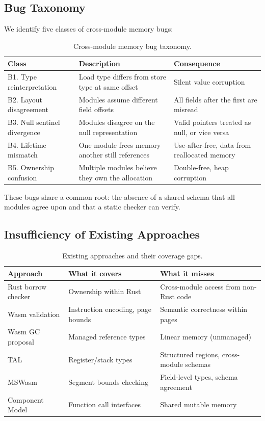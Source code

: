 \documentclass[11pt,a4paper]{article}
\begin{document}
\subsection{Bug Taxonomy}
\label{sec:bugs}

We identify five classes of cross-module memory bugs:

\begin{table}[htbp]
\centering
\caption{Cross-module memory bug taxonomy.}
\label{tab:bugs}
\begin{tabularx}{\textwidth}{@{}lXX@{}}
\toprule
\textbf{Class} & \textbf{Description} & \textbf{Consequence} \\
\midrule
B1. Type reinterpretation & Load type differs from store type at same offset & Silent value corruption \\
B2. Layout disagreement & Modules assume different field offsets & All fields after the first are misread \\
B3. Null sentinel divergence & Modules disagree on the null representation & Valid pointers treated as null, or vice versa \\
B4. Lifetime mismatch & One module frees memory another still references & Use-after-free, data from reallocated memory \\
B5. Ownership confusion & Multiple modules believe they own the allocation & Double-free, heap corruption \\
\bottomrule
\end{tabularx}
\end{table}

These bugs share a common root: the absence of a shared schema that all
modules agree upon and that a static checker can verify.

\subsection{Insufficiency of Existing Approaches}
\label{sec:existing}

\begin{table}[htbp]
\centering
\caption{Existing approaches and their coverage gaps.}
\label{tab:existing}
\begin{tabularx}{\textwidth}{@{}lXX@{}}
\toprule
\textbf{Approach} & \textbf{What it covers} & \textbf{What it misses} \\
\midrule
Rust borrow checker & Ownership within Rust & Cross-module access from non-Rust code \\
Wasm validation & Instruction encoding, page bounds & Semantic correctness within pages \\
Wasm GC proposal & Managed reference types & Linear memory (unmanaged) \\
TAL~\cite{morrisett1999} & Register/stack types & Structured regions, cross-module schemas \\
MSWasm~\cite{disselkoen2022} & Segment bounds checking & Field-level types, schema agreement \\
Component Model~\cite{wasmcomponent2024} & Function call interfaces & Shared mutable memory \\
\bottomrule
\end{tabularx}
\end{table}
\end{document}

